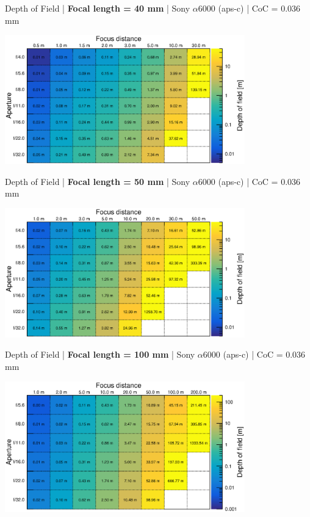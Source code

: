 \documentclass[aspectratio=169]{beamer}
\begin{document}
\begin{frame}[plain]{}
  \vspace{1ex}
  \centering
  Depth of Field | {\bf Focal length = 40 mm} |  Sony $\alpha$\hspace{0.1em}6000 (aps-c) | CoC = 0.036 mm
  
  \includegraphics[center,width=0.78\textwidth]{img/depth-of-field_focl40.eps}
\end{frame}

\begin{frame}[plain]{}
  \vspace{1ex}
  \centering
  Depth of Field | {\bf Focal length = 50 mm} |  Sony $\alpha$\hspace{0.1em}6000 (aps-c) | CoC = 0.036 mm
  
  \includegraphics[center,width=0.78\textwidth]{img/depth-of-field_focl50.eps}
\end{frame}

\begin{frame}[plain]{}
  \vspace{1ex}
  \centering
  Depth of Field | {\bf Focal length = 100 mm} |  Sony $\alpha$\hspace{0.1em}6000 (aps-c) | CoC = 0.036 mm
  
  \includegraphics[center,width=0.78\textwidth]{img/depth-of-field_focl100.eps}
\end{frame}
\end{document}
